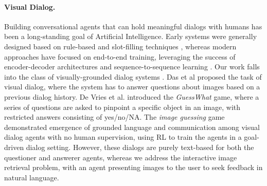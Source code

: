 \paragraph{Visual Dialog.} Building conversational agents that can hold meaningful dialogs with humans has been a long-standing goal of Artificial Intelligence.
Early systems were generally designed based on rule-based and slot-filling techniques \cite{williams2007partially}, whereas modern approaches have focused on end-to-end training, 
leveraging the success of encoder-decoder architectures and sequence-to-sequence learning \cite{serban2016building,bordes2016learning,guo2016learning}.
Our work falls into the class of visually-grounded dialog systems \cite{das2016visual,de2016guesswhat,seo2017visual,das2017learning,strub2017end}. Das et al \cite{das2016visual} proposed the task of visual dialog, where
the system has to answer questions about images based on a previous dialog history. 
De Vries et al. \cite{de2016guesswhat} introduced the {\em GuessWhat} game, where a series of questions are asked to pinpoint a specific object in an image, with restricted answers 
consisting of yes/no/NA.
The {\em image guessing} game \cite{das2017learning} %
demonstrated emergence of grounded language and communication
among visual dialog agents with no human supervision, using RL to train the agents in a goal-driven dialog setting.
However, these dialogs are purely text-based for both the questioner and answerer agents, whereas we address the interactive image retrieval problem,
with an agent presenting images to the user to seek feedback in natural language.

